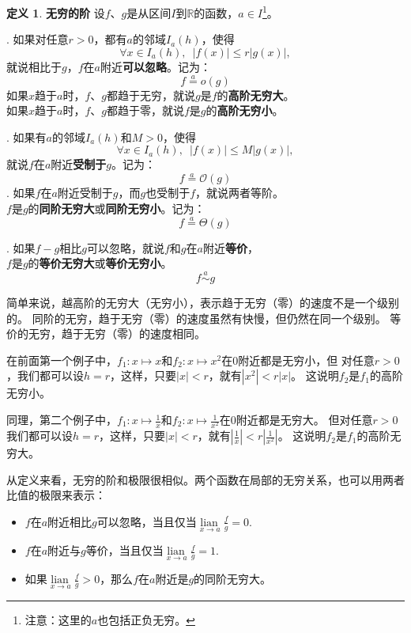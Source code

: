 \documentclass[12pt,UTF8]{ctexbook}
\newcommand{\lian}[1]{
    \underset{#1}{\operatorname{lian}\,}
}
\newcommand{\oveq}[1]{\overset{#1}{=}}
\newcommand{\olim}[1]{\mathit{o}\left(#1\right)}  %
\newcommand{\Olim}[1]{\mathcal{O}\left(#1\right)}  %
\newcommand{\Tlim}[1]{\mathcal{\Theta}\left(#1\right)}  %
\newcommand{\eqlim}[1]{\overset{#1}{\sim}}  %
\theoremstyle{definition}
\newtheorem{df}{定义}[section]
\theoremstyle{plain}
\begin{document}
\begin{df}{\textbf{无穷的阶}}
    设$f$、$g$是从区间$I$到$\mathbb{R}$的函数，$a\in I$\footnote{注意：这里的$a$也包括正负无穷。}。

    . 如果对任意$r>0$，都有$a$的邻域$I_a(h)$，使得
    $$ \forall x \in I_a(h), \,\,\, |f(x)| \leqslant r |g(x)|,$$
    \indent 就说相比于$g$，$f$在$a$附近\textbf{可以忽略}。记为：
    $$ f \oveq{a} \olim{g}$$
    \indent 如果$x$趋于$a$时，$f$、$g$都趋于无穷，就说$g$是$f$的\textbf{高阶无穷大}。\\
    \indent 如果$x$趋于$a$时，$f$、$g$都趋于零，就说$f$是$g$的\textbf{高阶无穷小}。

    . 如果有$a$的邻域$I_a(h)$和$M > 0$，使得
    $$ \forall x \in I_a(h), \,\,\, |f(x)| \leqslant M |g(x)|,$$
    \indent 就说$f$在$a$附近\textbf{受制于}$g$。记为：
    $$ f \oveq{a} \Olim{g}$$
    . 如果$f$在$a$附近受制于$g$，而$g$也受制于$f$，就说两者等阶。\\
    \indent $f$是$g$的\textbf{同阶无穷大}或\textbf{同阶无穷小}。记为：
    $$ f \oveq{a} \Tlim{g}$$

    . 如果$f - g$相比$g$可以忽略，就说$f$和$g$在$a$附近\textbf{等价}，\\
    \indent $f$是$g$的\textbf{等价无穷大}或\textbf{等价无穷小}。
    $$ f \eqlim{a} g$$

\end{df}

简单来说，越高阶的无穷大（无穷小），表示趋于无穷（零）的速度不是一个级别的。
同阶的无穷，趋于无穷（零）的速度虽然有快慢，但仍然在同一个级别。
等价的无穷，趋于无穷（零）的速度相同。

在前面第一个例子中，$f_1: x\mapsto x$和$f_2: x\mapsto x^2$在$0$附近都是无穷小，但
对任意$r > 0$，我们都可以设$h = r$，这样，只要$|x| < r$，就有$|x^2| < r|x|$。
这说明$f_2$是$f_1$的高阶无穷小。

同理，第二个例子中，$f_1: x\mapsto \frac{1}{x}$和$f_2: x\mapsto \frac{1}{x^2}$在$0$附近都是无穷大。
但对任意$r > 0$我们都可以设$h = r$，这样，只要$|x| < r$，就有$|\frac{1}{x}| < r|\frac{1}{x^2}|$。
这说明$f_2$是$f_1$的高阶无穷大。

从定义来看，无穷的阶和极限很相似。两个函数在局部的无穷关系，也可以用两者比值的极限来表示：
\begin{itemize}
    \item $f$在$a$附近相比$g$可以忽略，当且仅当$\lian{x\to a} \frac{f}{g} = 0.$
    \item $f$在$a$附近与$g$等价，当且仅当$\lian{x\to a} \frac{f}{g} = 1.$
    \item 如果$\lian{x\to a} \frac{f}{g} > 0$，那么$f$在$a$附近是$g$的同阶无穷大。
\end{itemize}
\end{document}
